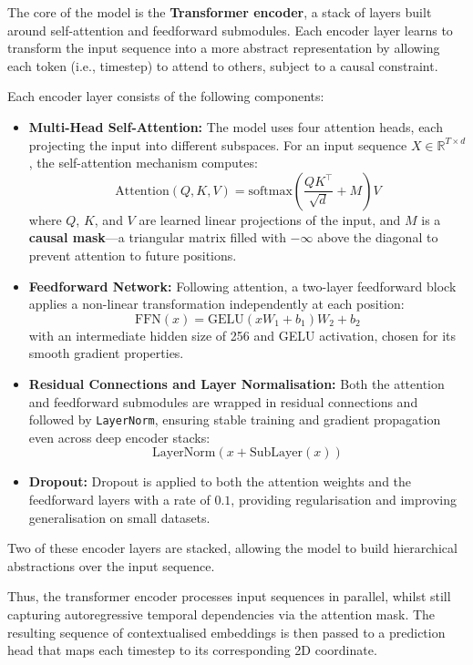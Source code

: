 
The core of the model is the \textbf{Transformer encoder}, a stack of layers built around self-attention and feedforward submodules. Each encoder layer learns to transform the input sequence into a more abstract representation by allowing each token (i.e., timestep) to attend to others, subject to a causal constraint.

Each encoder layer consists of the following components:

\begin{itemize}
    \item \textbf{Multi-Head Self-Attention:} The model uses four attention heads, each projecting the input into different subspaces. For an input sequence $X \in \mathbb{R}^{T \times d}$, the self-attention mechanism computes:
    \[
    \text{Attention}(Q, K, V) = \text{softmax}\left( \frac{QK^\top}{\sqrt{d}} + M \right) V
    \]
    where $Q$, $K$, and $V$ are learned linear projections of the input, and $M$ is a \textbf{causal mask}—a triangular matrix filled with $-\infty$ above the diagonal to prevent attention to future positions.

    \item \textbf{Feedforward Network:} Following attention, a two-layer feedforward block applies a non-linear transformation independently at each position:
    \[
    \text{FFN}(x) = \text{GELU}(xW_1 + b_1)W_2 + b_2
    \]
    with an intermediate hidden size of 256 and GELU activation, chosen for its smooth gradient properties.

    \item \textbf{Residual Connections and Layer Normalisation:} Both the attention and feedforward submodules are wrapped in residual connections and followed by \texttt{LayerNorm}, ensuring stable training and gradient propagation even across deep encoder stacks:
    \[
    \text{LayerNorm}(x + \text{SubLayer}(x))
    \]

    \item \textbf{Dropout:} Dropout is applied to both the attention weights and the feedforward layers with a rate of $0.1$, providing regularisation and improving generalisation on small datasets.
\end{itemize}

Two of these encoder layers are stacked, allowing the model to build hierarchical abstractions over the input sequence.

Thus, the transformer encoder processes input sequences in parallel, whilst still capturing autoregressive temporal dependencies via the attention mask. The resulting sequence of contextualised embeddings is then passed to a prediction head that maps each timestep to its corresponding 2D coordinate.

